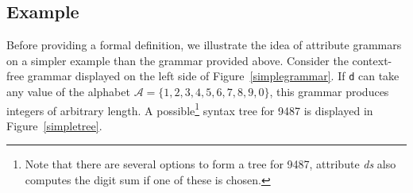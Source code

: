 \subsection{Example}
Before providing a formal definition, we illustrate the idea of attribute grammars on a simpler example than the grammar provided above. 
Consider the context-free grammar displayed on the left side of Figure~\ref{simplegrammar}. 
If \texttt{d} can take any value of the alphabet $\mathcal{A}=\{1,2,3,4,5,6,7,8,9,0\}$, %
this 
grammar produces integers of arbitrary length.
%
%
%
A possible\footnote{Note that there are several options to form a tree for 9487, attribute \textit{ds} also computes the digit sum if one of these is chosen.} syntax tree for 9487
is displayed in Figure~\ref{simpletree}. %
%
